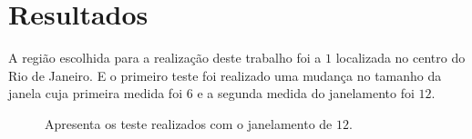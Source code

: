 \documentclass[journal, a4paper]{IEEEtran}
\begin{document}
\section{Resultados}
A região escolhida para a realização deste trabalho foi a $1$ localizada no centro do Rio de Janeiro. E o primeiro teste foi realizado uma mudança no tamanho da janela cuja primeira medida foi $6$ e a segunda medida do janelamento foi $12$.


\begin{figure}[ht!]
	\centering
	\quad %
	\quad %
	\caption{Apresenta os teste realizados com o janelamento de $12$.}
	\label{Teste1}
\end{figure}
\end{document}
